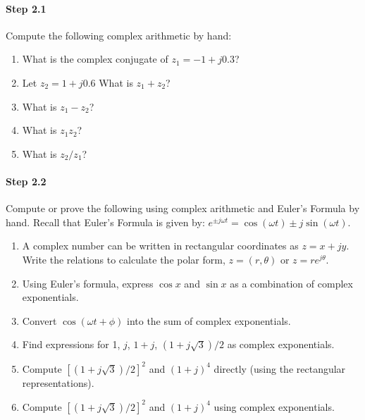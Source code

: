 \paragraph{Step 2.1} Compute the following complex arithmetic by hand:
\begin{enumerate}\renewcommand{\theenumi}{\alph{enumi}}
\item What is the complex conjugate of $z_1 = -1 + j 0.3$?

\item Let $z_2 = 1 + j 0.6$ What is $z_1 + z_2$?

\item What is $z_1 - z_2$?

\item What is $z_1 z_2$?

\item What is $z_2/z_1$?

\end{enumerate}

\paragraph{Step 2.2} Compute or prove the following using complex arithmetic and Euler's Formula by hand. Recall that Euler's Formula is given by: $e^{\pm j\omega t}=\cos(\omega t) \pm j \sin(\omega t)$.

\begin{enumerate}
\item A complex number can be written in rectangular coordinates as $z
  = x + j y$. Write the relations to calculate the polar form, $z=(r,
  \theta)$ or $z = r e^{j\theta}$.

\item Using Euler's formula, express $\cos x$ and $\sin x$ as a
  combination of complex exponentials.
  
\item Convert $\cos(\omega t+\phi)$ into the sum of complex exponentials.  

\item Find expressions for 1, $j$, $1 + j$, $(1 + j\sqrt{3})/2$ as
  complex exponentials.

\item Compute $[(1+j\sqrt{3})/2]^2$ and $(1+j)^4$ directly (using the
  rectangular representations).
  
\item Compute $[(1+j\sqrt{3})/2]^2$ and $(1+j)^4$ using complex
  exponentials.
  
\end{enumerate}


